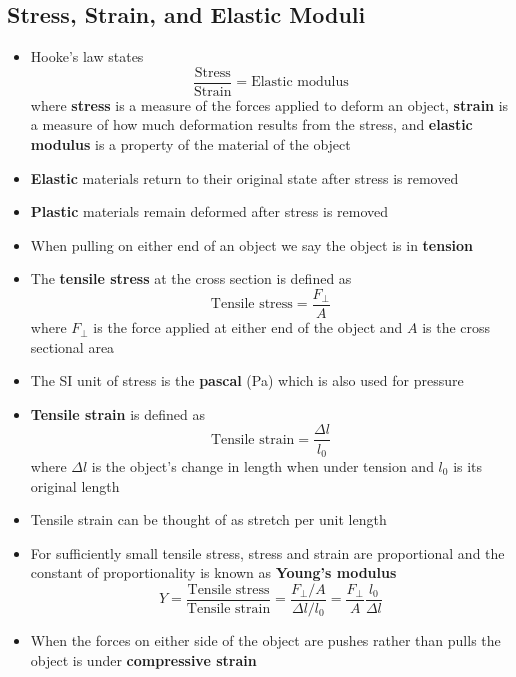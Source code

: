 \documentclass{article}
\begin{document}
\setcounter{subsection}{3}
\subsection{Stress, Strain, and Elastic Moduli}

\begin{itemize}
    \item Hooke's law states \[\frac{\textrm{Stress}}{\textrm{Strain}}=\textrm{Elastic modulus}\] where \textbf{stress} is a measure of the forces applied to deform an object, \textbf{strain} is a measure of how much deformation results from the stress, and \textbf{elastic modulus} is a property of the material of the object

    \item \textbf{Elastic} materials return to their original state after stress is removed

    \item \textbf{Plastic} materials remain deformed after stress is removed

    \item When pulling on either end of an object we say the object is in \textbf{tension}

    \item The \textbf{tensile stress} at the cross section is defined as \[\textrm{Tensile stress}=\frac{F_\perp}{A}\] where $F_\perp$ is the force applied at either end of the object and $A$ is the cross sectional area

    \item The SI unit of stress is the \textbf{pascal} (Pa) which is also used for pressure

    \item \textbf{Tensile strain} is defined as \[\textrm{Tensile strain} = \frac{\Delta l}{l_0}\] where $\Delta l$ is the object's change in length when under tension and $l_0$ is its original length

    \item Tensile strain can be thought of as stretch per unit length

    \item For sufficiently small tensile stress, stress and strain are proportional and the constant of proportionality is known as \textbf{Young's modulus} \[Y = \frac{\textrm{Tensile stress}}{\textrm{Tensile strain}} = \frac{F_\perp / A}{\Delta l / l_0} = \frac{F_\perp}{A} \frac{l_0}{\Delta l}\]

    \item When the forces on either side of the object are pushes rather than pulls the object is under \textbf{compressive strain}


\end{itemize}
\end{document}
